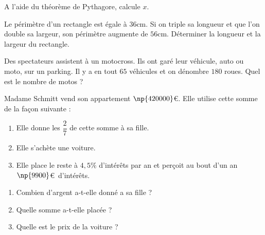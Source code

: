 \documentclass[a4paper,10pt]{report}
\begin{document}
\begin{ex}

\vspace{-1cm}
\noindent \begin{minipage}{8cm}
\vspace{0.8cm}
A l'aide du théorème de Pythagore, calcule $x$.
\end{minipage}
\begin{minipage}{8cm}
\begin{center}
\end{center}
\end{minipage}
\end{ex}

\begin{ex}
Le périmètre d'un rectangle est égale à $36$cm. Si on triple sa longueur et que l'on double sa largeur, son périmètre augmente de $56$cm. Déterminer la longueur et la largeur du rectangle.
\end{ex}

\begin{ex}
Des spectateurs assistent à un motocross. Ils ont garé leur véhicule, auto ou moto, sur un parking. Il y a en tout $65$ véhicules et on dénombre $180$ roues. Quel est le nombre de motos ?
\end{ex}

\begin{ex}
Madame Schmitt vend son appartement $\np{420000}$\euro . Elle utilise cette somme de la façon suivante :
\begin{enumerate}
\item[•] Elle donne les $\dfrac{2}{7}$ de cette somme à sa fille.
\item[•] Elle s'achète une voiture.
\item[•] Elle place le reste à $4,5\%$ d'intérêts par an et perçoit au bout d'un an $\np{9900}$\euro ~d'intérêts.
\end{enumerate}
\begin{enumerate}[font=\color{exer3}]
\item Combien d'argent a-t-elle donné a sa fille ?
\item Quelle somme a-t-elle placée ?
\item Quelle est le prix de la voiture ?
\end{enumerate}
\end{ex}
\end{document}
